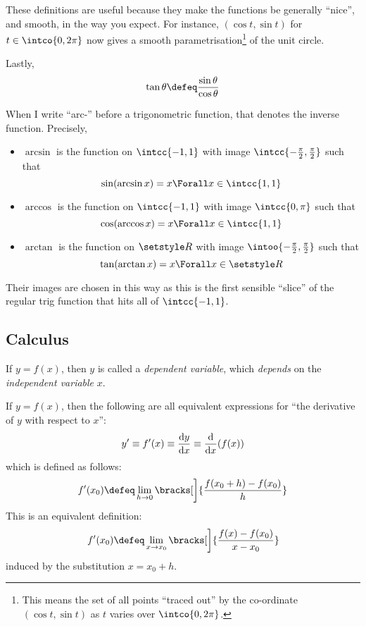 These definitions are useful because they make the functions be generally
``nice'', and smooth, in the way you expect. For instance,
\((\cos t, \sin t)\) for \(t \in \intco{0, 2\pi}\) now gives a smooth
parametrisation\footnote{
 This means the set of all points ``traced out'' by the co-ordinate
 \((\cos t, \sin t)\) as \(t\) varies over
 \(\intco{0, 2\pi}\).
} of the unit circle.

Lastly,
\begin{equation*}
 \tan \theta \defeq \frac{\sin \theta}{\cos \theta}
\end{equation*}

When I write ``arc-'' before a trigonometric function, that denotes the inverse
function. Precisely,
\begin{itemize}
 \item
  \(\arcsin\) is the function on \(\intcc{-1, 1}\) with image
  \(\intcc{-\frac \pi 2, \frac \pi 2}\) such that
  \begin{equation*}
   \sin(\arcsin x) = x \Forall x \in \intcc{1, 1}
  \end{equation*}
 \item
  \(\arccos\) is the function on \(\intcc{-1, 1}\) with image
  \(\intcc{0, \pi}\) such that
  \begin{equation*}
   \cos(\arccos x) = x \Forall x \in \intcc{1, 1}
  \end{equation*}
 \item
  \(\arctan\) is the function on \(\Reals\) with image
  \(\intoo{-\frac \pi 2, \frac \pi 2}\) such that
  \begin{equation*}
   \tan(\arctan x) = x \Forall x \in \Reals
  \end{equation*}
\end{itemize}
Their images are chosen in this way as this is the first sensible ``slice'' of
the regular trig function that hits all of \(\intcc{-1, 1}\).

\subsection{Calculus}

If \(y = f(x)\), then \(y\) is called a \emph{dependent variable}, which
\emph{depends} on the \emph{independent variable} \(x\).

If \(y = f(x)\), then the following are all equivalent expressions for ``the
derivative of \(y\) with respect to \(x\)'':
\begin{equation*}
 y'
 \equiv f'(x)
 \equiv \dv<y>{x}
 \equiv \dv{x}(f(x))
\end{equation*}
which is defined as follows:
\begin{equation*}
 f'(x_0) \defeq
  \lim_{h \to 0}
   \bracks[\bigg]{
    \frac{f(x_0 + h) - f(x_0)} h
   }
\end{equation*}
This is an equivalent definition:
\begin{equation*}
 f'(x_0) \defeq
  \lim_{x \to x_0}
  \bracks[\bigg]{
   \frac{f(x) - f(x_0)}{x - x_0}
  }
\end{equation*}
induced by the substitution \(x = x_0 + h\).


